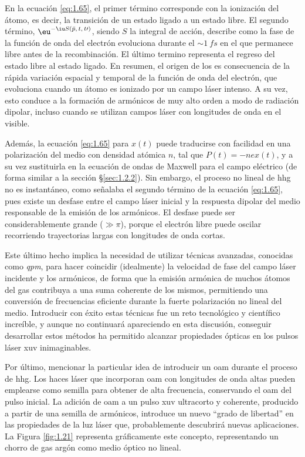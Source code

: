 En la ecuación \eqref{eq:1.65}, el primer término corresponde con la ionización del átomo, es decir, la transición de un estado ligado a un estado libre. El segundo término, $\eu^{-\iu S(\bar{p},\,t,\,t \prime )}$, siendo $S$ la integral de acción, describe como la fase de la función de onda del electrón evoluciona durante el $\sim \qty{1}{fs}$ en el que permanece libre antes de la recombinación. El último termino representa el regreso del estado libre al estado ligado. En resumen, el origen de los  es consecuencia de la rápida variación espacial y temporal de la función de onda del electrón, que evoluciona cuando un átomo es ionizado por un campo láser intenso. A su vez, esto conduce a la formación de armónicos de muy alto orden a modo de radiación dipolar, incluso cuando se utilizan campos láser con longitudes de onda en el visible.

Además, la ecuación \eqref{eq:1.65} para $x(t)$ puede traducirse con facilidad en una polarización del medio con densidad atómica $n$, tal que $P(t)=-nex(t)$, y a su vez sustituirla en la ecuación de ondas de Maxwell para el campo eléctrico \autocite{Bloembergen1962} (de forma similar a la sección \S\ref{sec:1.2.2}). Sin embargo, el proceso no lineal de \acrshort{hhg} no es instantáneo, como señalaba el segundo término de la ecuación \eqref{eq:1.65}, pues existe un desfase entre el campo láser inicial y la respuesta dipolar del medio responsable de la emisión de los armónicos. El desfase puede ser considerablemente grande ($\gg \pi$), porque el electrón libre puede oscilar recorriendo trayectorias largas con longitudes de onda cortas. 

Este último hecho implica la necesidad de utilizar técnicas avanzadas, conocidas como \emph{\acrfull{qpm}}, para hacer coincidir (idealmente) la velocidad de fase del campo láser incidente y los armónicos, de forma que la emisión armónica de muchos átomos del gas contribuya a una suma coherente de los mismos, permitiendo una conversión de frecuencias eficiente durante la fuerte polarización no lineal del medio. Introducir con éxito estas técnicas fue un reto tecnológico y científico increíble, y aunque no continuará apareciendo en esta discusión, conseguir desarrollar estos métodos ha permitido alcanzar propiedades ópticas en los pulsos láser \acrshort{xuv} inimaginables.

Por último, mencionar la particular idea de introducir un \acrshort{oam} durante el proceso de \acrshort{hhg}. Los haces láser que incorporan \acrshort{oam} con longitudes de onda altas pueden emplearse como semilla para obtener  de alta frecuencia, conservando el \acrshort{oam} del pulso inicial. La adición de \acrshort{oam} a un pulso \acrshort{xuv} ultracorto y coherente, producido a partir de una semilla de armónicos, introduce un nuevo \enquote{grado de libertad} en las propiedades de la luz láser que, probablemente descubrirá nuevas aplicaciones. La Figura \ref{fig:1.21} representa gráficamente este concepto, representando un chorro de gas argón como medio óptico no lineal.

